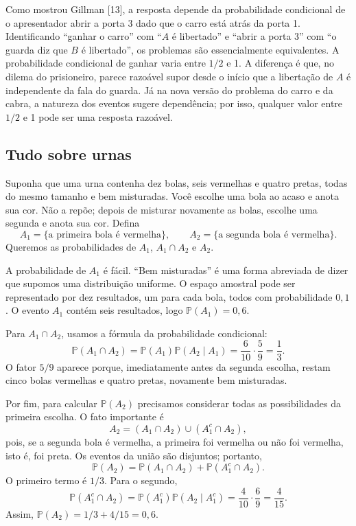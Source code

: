 Como mostrou Gillman [13], a resposta depende da probabilidade condicional de o apresentador abrir a porta 3 dado que o carro está atrás da porta 1. Identificando ``ganhar o carro'' com ``$A$ é libertado'' e ``abrir a porta 3'' com ``o guarda diz que $B$ é libertado'', os problemas são essencialmente equivalentes. A probabilidade condicional de ganhar varia entre $1/2$ e 1. A diferença é que, no dilema do prisioneiro, parece razoável supor desde o início que a libertação de $A$ é independente da fala do guarda. Já na nova versão do problema do carro e da cabra, a natureza dos eventos sugere dependência; por isso, qualquer valor entre $1/2$ e 1 pode ser uma resposta razoável.

\subsection{Tudo sobre urnas}
\label{isaac:sec:urnas}

Suponha que uma urna contenha dez bolas, seis vermelhas e quatro pretas, todas do mesmo tamanho e bem misturadas. Você escolhe uma bola ao acaso e anota sua cor. Não a repõe; depois de misturar novamente as bolas, escolhe uma segunda e anota sua cor. Defina
\[
A_1=\{\text{a primeira bola é vermelha}\},\qquad
A_2=\{\text{a segunda bola é vermelha}\}.
\]
Queremos as probabilidades de $A_1$, $A_1\cap A_2$ e $A_2$.

A probabilidade de $A_1$ é fácil. ``Bem misturadas'' é uma forma abreviada de dizer que supomos uma distribuição uniforme. O espaço amostral pode ser representado por dez resultados, um para cada bola, todos com probabilidade $0{,}1$. O evento $A_1$ contém seis resultados, logo $\mathbb{P}(A_1)=0{,}6$.

Para $A_1\cap A_2$, usamos a fórmula da probabilidade condicional:
\[
\mathbb{P}(A_1\cap A_2)=\mathbb{P}(A_1)\mathbb{P}(A_2\mid A_1)
=\frac6{10}\cdot\frac59=\frac13.
\]
O fator $5/9$ aparece porque, imediatamente antes da segunda escolha, restam cinco bolas vermelhas e quatro pretas, novamente bem misturadas.

Por fim, para calcular $\mathbb{P}(A_2)$ precisamos considerar todas as possibilidades da primeira escolha. O fato importante é
\[
A_2=(A_1\cap A_2)\cup(A_1^c\cap A_2),
\]
pois, se a segunda bola é vermelha, a primeira foi vermelha ou não foi vermelha, isto é, foi preta. Os eventos da união são disjuntos; portanto,
\[
\mathbb{P}(A_2)=\mathbb{P}(A_1\cap A_2)+\mathbb{P}(A_1^c\cap A_2).
\]
O primeiro termo é $1/3$. Para o segundo,
\[
\mathbb{P}(A_1^c\cap A_2)=\mathbb{P}(A_1^c)\mathbb{P}(A_2\mid A_1^c)
=\frac4{10}\cdot\frac69=\frac4{15}.
\]
Assim, $\mathbb{P}(A_2)=1/3+4/15=0{,}6$.

